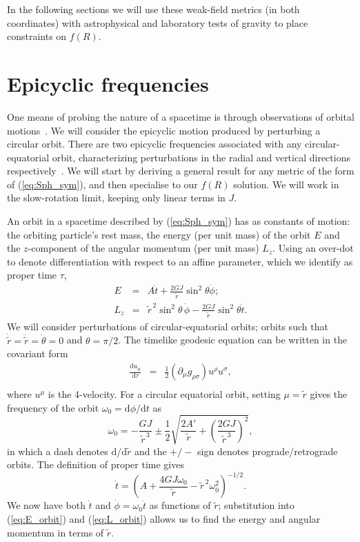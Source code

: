 \documentclass[aps,prd,amsfonts,amssymb,amsmath,nofootinbib,reprint,showpacs]{revtex4-1}
\newcommand{\eqnref}[1]{(\ref{eq:#1})}
\newcommand{\dd}{\ensuremath{\text{d}}}
\begin{document}
In the following sections we will use these weak-field metrics (in both coordinates) with astrophysical and laboratory tests of gravity to place constraints on $f(R)$.

\section{Epicyclic frequencies\label{sec:Epicycle}}

One means of probing the nature of a spacetime is through observations of orbital motions~\cite{Gair2008a}. We will consider the epicyclic motion produced by perturbing a circular orbit. There are two epicyclic frequencies associated with any circular-equatorial orbit, characterizing perturbations in the radial and vertical directions respectively~\cite{Binney1987}. We will start by deriving a general result for any metric of the form of \eqnref{Sph_sym}, and then specialise to our $f(R)$ solution. We will work in the slow-rotation limit, keeping only linear terms in $J$.

An orbit in a spacetime described by \eqnref{Sph_sym} has as constants of motion: the orbiting particle's rest mass, the energy (per unit mass) of the orbit $E$ and the $z$-component of the angular momentum (per unit mass) $L_z$. Using an over-dot to denote differentiation with respect to an affine parameter, which we identify as proper time $\tau$,
\begin{eqnarray}
\label{eq:E_orbit}
E & = & A\dot{t} + \frac{2GJ}{\widetilde{r}} \sin^2\theta\dot{\phi}; \\
L_z & = & \widetilde{r}^{\,2}\sin^2\theta\, \dot{\phi} - \frac{2GJ}{\widetilde{r}} \sin^2\theta\dot{t} .
\label{eq:L_orbit}
\end{eqnarray}
We will consider perturbations of circular-equatorial orbits; orbits such that $\dot{\widetilde{r}} = \ddot{\widetilde{r}} = \dot{\theta}= 0$ and $\theta = \pi/2$. The timelike geodesic equation can be written in the covariant form
\begin{eqnarray}
\frac{\dd u_\mu}{\dd \tau} & = & \frac{1}{2} \left(\partial_\mu g_{\rho\sigma} \right) u^\rho u^\sigma,\\
& & \nonumber
\end{eqnarray}
where $u^\mu$ is the 4-velocity. For a circular equatorial orbit, setting $\mu = \widetilde{r}$ gives the frequency of the orbit $\omega_0 = \dd\phi/\dd t$ as
\begin{equation}
\omega_0 = -\frac{GJ}{\widetilde{r}^{\,3}} \pm \frac{1}{2} \sqrt{\frac{2A'}{\widetilde{r}} + \left(\frac{2GJ}{\widetilde{r}^{\,3}}\right)^2},
\label{eq:omz}
\end{equation}
in which a dash denotes $\dd/\dd\widetilde{r}$ and the $+/-$ sign denotes prograde/retrograde orbits. The definition of proper time gives
\begin{equation}
\dot{t} = \left(A + \frac{4GJ\omega_0}{\widetilde{r}} - \widetilde{r}^{\,2}\omega_0^2 \right)^{-1/2}.
\end{equation}
We now have both $\dot{t}$ and $\dot{\phi} = \omega_0\dot{t}$ as functions of $\widetilde{r}$; substitution into \eqnref{E_orbit} and \eqnref{L_orbit} allows us to find the energy and angular momentum in terms of $\widetilde{r}$.
\end{document}
